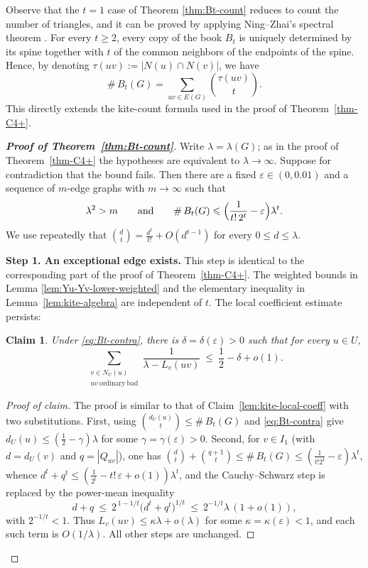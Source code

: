 \documentclass[10pt,a4paper]{amsart}
\newtheorem{claim}[theorem]{Claim}
\renewcommand{\le}{\leqslant}
\renewcommand{\ge}{\geqslant}
\begin{document}
Observe that the $t=1$ case of Theorem \ref{thm:Bt-count} reduces to count the number of triangles, and it can be proved by applying  Ning--Zhai's spectral theorem \cite{NingZhai2023}. 
 For every $t\ge2$, 
 every copy of the book $B_t$ is uniquely determined by its spine
together with $t$ of the common neighbors of the endpoints of the spine. Hence, by denoting $\tau(uv):=|N(u)\cap N(v)|$, we have 
\begin{equation}\label{eq:book-count-t}
   \texttt{\#}\,B_t(G)=\sum_{uv\in E(G)}\binom{\tau(uv)}{t}.
\end{equation}
This directly extends the kite-count formula used in the proof of Theorem~\ref{thm-C4+}. 



\begin{proof}[{\bf Proof of Theorem~\ref{thm:Bt-count}}]
Write $\lambda=\lambda(G)$; as in the proof of Theorem~\ref{thm-C4+} the
hypotheses are equivalent to $\lambda\to\infty$.  Suppose for contradiction that
the bound fails.  Then there are a fixed $\varepsilon\in(0,0.01)$
and a sequence of $m$-edge graphs with $m\to\infty$ such that
\begin{equation}\label{eq:Bt-contra}
   \lambda^2>m
   \qquad\text{and}\qquad
   \texttt{\#}\,B_t(G)\le\Bigl(\frac{1}{t!\,2^{t}}-\varepsilon\Bigr)\lambda^{t}. 
\end{equation}
 We use repeatedly that
$\binom{d}{t}=\tfrac{d^t}{t!}+O(d^{t-1})$ for every $0\le d\le\lambda$.

\medskip
\noindent\textbf{Step 1. An exceptional edge exists.}
This step is identical to the corresponding part of the proof of
Theorem~\ref{thm-C4+}.  The weighted bounds
in Lemma \ref{lem:Yu-Yv-lower-weighted} and the elementary inequality in Lemma~\ref{lem:kite-algebra} are
independent of $t$.  The local coefficient estimate persists:

\begin{claim}\label{cl:Bt-coeff}
Under \eqref{eq:Bt-contra}, there is $\delta=\delta(\varepsilon)>0$ such that 
for every $u\in U$,
\[
   \sum_{\substack{v\in N_U(u)\\ uv\ \mathrm{ordinary\ bad}}}
   \frac{1}{\lambda-L_v(uv)}\ \le\ \frac12-\delta+o(1).
\]
\end{claim}

\begin{proof}[Proof of claim]
The proof is similar to that of Claim~\ref{lem:kite-local-coeff} with two
substitutions.  First, using $\binom{d_U(u)}{t}\le\texttt{\#}\,B_t(G)$ and
\eqref{eq:Bt-contra} give $d_U(u)\le(\tfrac12-\gamma)\lambda$ for some
$\gamma=\gamma(\varepsilon)>0$.  Second, for $v\in I_1$ (with $d=d_U(v)$ and 
$q=|Q_{uv}|$), one has $\binom{d}{t}+\binom{q+1}{t}\le\texttt{\#}\,B_t(G)
\le(\tfrac1{t!2^t}-\varepsilon)\lambda^t$, whence
$d^t+q^t\le(\tfrac1{2^t}-t!\,\varepsilon+o(1))\lambda^t$, and the
Cauchy--Schwarz step is replaced by the power-mean inequality
\[
   d+q\ \le\ 2^{\,1-1/t}\bigl(d^t+q^t\bigr)^{1/t}\ \le\ 2^{-1/t}\lambda\,(1+o(1)),
\]
with $2^{-1/t}<1$.  Thus $L_v(uv)\le\kappa\lambda+o(\lambda)$ for some
$\kappa=\kappa(\varepsilon)<1$, and each such term is $O(1/\lambda)$.  All other
steps are unchanged.
\end{proof}


\end{proof}
\end{document}

